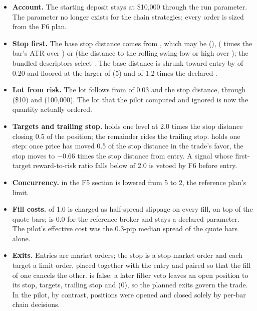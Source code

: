 \begin{itemize}
    \item \textbf{Account.} The starting deposit stays at \$10,000 through the  run parameter. The  parameter no longer exists for the chain strategies; every order is sized from the F6 plan.
    \item \textbf{Stop first.} The base stop distance comes from , which may be  (),  ( times the bar's ATR over ) or  (the distance to the rolling swing low or high over ); the bundled descriptors select . The base distance is shrunk toward entry by  of 0.20 and floored at the larger of  (5) and  of 1.2 times the declared .
    \item \textbf{Lot from risk.} The lot follows from  of 0.03 and the stop distance, through  (\$10) and  (100,000). The lot that the pilot computed and ignored is now the quantity actually ordered.
    \item \textbf{Targets and trailing stop.}  holds one level at 2.0 times the stop distance closing 0.5 of the position; the remainder rides the trailing stop.  holds one step: once price has moved 0.5 of the stop distance in the trade's favor, the stop moves to $-0.66$ times the stop distance from entry. A signal whose first-target reward-to-risk ratio falls below  of 2.0 is vetoed by F6 before entry.
    \item \textbf{Concurrency.}  in the F5 section is lowered from 5 to 2, the reference plan's limit.
    \item \textbf{Fill costs.}  of 1.0 is charged as half-spread slippage on every fill, on top of the quote bars;  is 0.0 for the reference broker and stays a declared parameter. The pilot's effective cost was the 0.3-pip median spread of the quote bars alone.
    \item \textbf{Exits.} Entries are market orders; the stop is a stop-market order and each target a limit order, placed together with the entry and paired so that the fill of one cancels the other.  is false: a later filter veto leaves an open position to its stop, targets, trailing stop and  (0), so the planned exits govern the trade. In the pilot, by contrast, positions were opened and closed solely by per-bar chain decisions.
\end{itemize}

